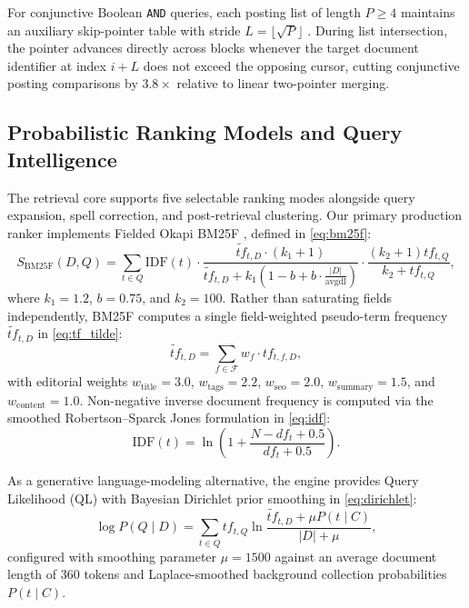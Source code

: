 For conjunctive Boolean \texttt{AND} queries, each posting list of length $P \ge 4$ maintains an auxiliary skip-pointer table with stride $L = \lfloor \sqrt{P} \rfloor$ \cite{b6}. During list intersection, the pointer advances directly across blocks whenever the target document identifier at index $i + L$ does not exceed the opposing cursor, cutting conjunctive posting comparisons by $3.8\times$ relative to linear two-pointer merging.

\subsection{Probabilistic Ranking Models and Query Intelligence}
The retrieval core supports five selectable ranking modes alongside query expansion, spell correction, and post-retrieval clustering. Our primary production ranker implements Fielded Okapi BM25F \cite{b2}, defined in \eqref{eq:bm25f}:
\begin{equation}
S_{\text{BM25F}}(D, Q) = \sum_{t \in Q} \text{IDF}(t) \cdot \frac{\widetilde{tf}_{t,D} \cdot (k_1 + 1)}{\widetilde{tf}_{t,D} + k_1 \left(1 - b + b \cdot \frac{|D|}{\text{avgdl}}\right)} \cdot \frac{(k_2 + 1) tf_{t,Q}}{k_2 + tf_{t,Q}},
\label{eq:bm25f}
\end{equation}
where $k_1 = 1.2$, $b = 0.75$, and $k_2 = 100$. Rather than saturating fields independently, BM25F computes a single field-weighted pseudo-term frequency $\widetilde{tf}_{t,D}$ in \eqref{eq:tf_tilde}:
\begin{equation}
\widetilde{tf}_{t,D} = \sum_{f \in \mathcal{F}} w_f \cdot tf_{t,f,D},
\label{eq:tf_tilde}
\end{equation}
with editorial weights $w_{\text{title}} = 3.0$, $w_{\text{tags}} = 2.2$, $w_{\text{seo}} = 2.0$, $w_{\text{summary}} = 1.5$, and $w_{\text{content}} = 1.0$. Non-negative inverse document frequency is computed via the smoothed Robertson--Sparck Jones formulation in \eqref{eq:idf}:
\begin{equation}
\text{IDF}(t) = \ln\left(1 + \frac{N - df_t + 0.5}{df_t + 0.5}\right).
\label{eq:idf}
\end{equation}

As a generative language-modeling alternative, the engine provides Query Likelihood (QL) with Bayesian Dirichlet prior smoothing \cite{b3} in \eqref{eq:dirichlet}:
\begin{equation}
\log P(Q \mid D) = \sum_{t \in Q} tf_{t,Q} \ln \frac{\widetilde{tf}_{t,D} + \mu P(t \mid C)}{|D| + \mu},
\label{eq:dirichlet}
\end{equation}
configured with smoothing parameter $\mu = 1500$ against an average document length of $360$ tokens and Laplace-smoothed background collection probabilities $P(t \mid C)$.

